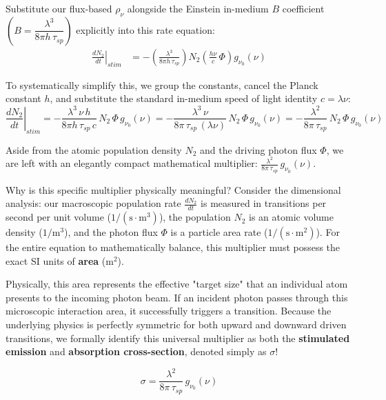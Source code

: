 Substitute our flux-based $\rho_\nu$ alongside the Einstein in-medium $B$ coefficient $\left(B = \dfrac{\lambda^3}{8\pi h\,\tau_{sp}}\right)$ explicitly into this rate equation:
\begin{align*}
    \left.\frac{dN_2}{dt}\right|_{stim} & = -\left( \frac{\lambda^3}{8\pi h\,\tau_{sp}} \right) N_2 \left( \frac{h\nu}{c}\,\Phi \right) g_{\nu_0}(\nu)
\end{align*}

To systematically simplify this, we group the constants, cancel the Planck constant $h$, and substitute the standard in-medium speed of light identity $c = \lambda\nu$:
\begin{equation*}
    \left.\frac{dN_2}{dt}\right|_{stim} = -\frac{\lambda^3\,\nu\,h}{8\pi h\,\tau_{sp}\,c}\,N_2\,\Phi\,g_{\nu_0}(\nu) = -\frac{\lambda^3\,\nu}{8\pi\,\tau_{sp}\,(\lambda\nu)}\,N_2\,\Phi\,g_{\nu_0}(\nu) = -\frac{\lambda^2}{8\pi\,\tau_{sp}}\,N_2\,\Phi\,g_{\nu_0}(\nu)
\end{equation*}

Aside from the atomic population density $N_2$ and the driving photon flux $\Phi$, we are left with an elegantly compact mathematical multiplier: $\frac{\lambda^2}{8\pi\,\tau_{sp}}\,g_{\nu_0}(\nu)$.

Why is this specific multiplier physically meaningful? Consider the dimensional analysis: our macroscopic population rate $\frac{dN_2}{dt}$ is measured in transitions per second per unit volume ($1/(\text{s}\cdot\text{m}^3)$), the population $N_2$ is an atomic volume density ($1/\text{m}^3$), and the photon flux $\Phi$ is a particle area rate ($1/(\text{s}\cdot\text{m}^2)$). For the entire equation to mathematically balance, this multiplier must possess the exact SI units of \textbf{area} ($\text{m}^2$).

Physically, this area represents the effective "target size" that an individual atom presents to the incoming photon beam. If an incident photon passes through this microscopic interaction area, it successfully triggers a transition. Because the underlying physics is perfectly symmetric for both upward and downward driven transitions, we formally identify this universal multiplier as both the \textbf{stimulated emission} and \textbf{absorption cross-section}, denoted simply as $\sigma$!

\begin{keyresult}
    \begin{equation}
        \sigma = \frac{\lambda^2}{8\pi\,\tau_{sp}}\,g_{\nu_0}(\nu)
    \end{equation}
\end{keyresult}

